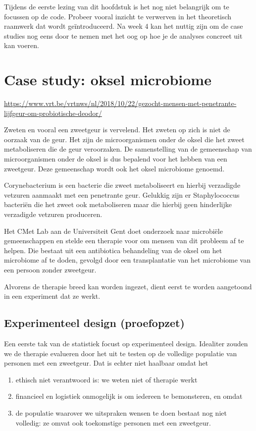 \documentclass[
  dutch,
  letterpaper,
  12pt]{book}
\providecommand{\tightlist}{%
  \setlength{\itemsep}{0pt}\setlength{\parskip}{0pt}}
\theoremstyle{definition}
\theoremstyle{definition}
\theoremstyle{definition}
\theoremstyle{remark}
\begin{document}
Tijdens de eerste lezing van dit hoofdstuk is het nog niet belangrijk om
te focussen op de code. Probeer vooral inzicht te verwerven in het
theoretisch raamwerk dat wordt geïntroduceerd. Na week 4 kan het nuttig
zijn om de case studies nog eens door te nemen met het oog op hoe je de
analyses concreet uit kan voeren.

\section{Case study: oksel
microbiome}\label{case-study-oksel-microbiome}

\url{https://www.vrt.be/vrtnws/nl/2018/10/22/gezocht-mensen-met-penetrante-lijfgeur-om-probiotische-deodor/}

Zweten en vooral een zweetgeur is vervelend. Het zweten op zich is niet
de oorzaak van de geur. Het zijn de microorganismen onder de oksel die
het zweet metaboliseren die de geur veroorzaken. De samenstelling van de
gemeenschap van microorganismen onder de oksel is dus bepalend voor het
hebben van een zweetgeur. Deze gemeenschap wordt ook het oksel
microbiome genoemd.

Corynebacterium is een bacterie die zweet metaboliseert en hierbij
verzadigde vetzuren aanmaakt met een penetrante geur. Gelukkig zijn er
Staphylococcus bacteriën die het zweet ook metaboliseren maar die
hierbij geen hinderlijke verzadigde vetzuren produceren.

Het CMet Lab aan de Universiteit Gent doet onderzoek naar microbiële
gemeenschappen en stelde een therapie voor om mensen van dit probleem af
te helpen. Die bestaat uit een antibiotica behandeling van de oksel om
het microbiome af te doden, gevolgd door een transplantatie van het
microbiome van een persoon zonder zweetgeur.

Alvorens de therapie breed kan worden ingezet, dient eerst te worden
aangetoond in een experiment dat ze werkt.

\subsection{Experimenteel design
(proefopzet)}\label{experimenteel-design-proefopzet}

Een eerste tak van de statistiek focust op experimenteel design.
Idealiter zouden we de therapie evalueren door het uit te testen op de
volledige populatie van personen met een zweetgeur. Dat is echter niet
haalbaar omdat het

\begin{enumerate}
\def\labelenumi{\arabic{enumi}.}
\tightlist
\item
  ethisch niet verantwoord is: we weten niet of therapie werkt
\item
  financieel en logistiek onmogelijk is om iedereen te bemonsteren, en
  omdat
\item
  de populatie waarover we uitspraken wensen te doen bestaat nog niet
  volledig: ze omvat ook toekomstige personen met een zweetgeur.
\end{enumerate}
\end{document}
